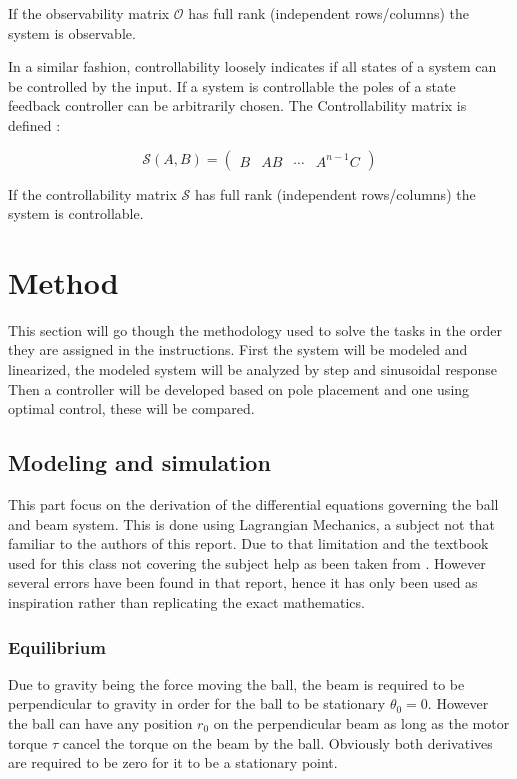 \documentclass[a4paper, titlepage]{article}
\begin{document}
If the observability matrix $\mathcal{O}$ has full rank (independent rows/columns) the system is observable.

In a similar fashion, controllability loosely indicates if all states of a system can be controlled by the input. If a system is controllable the poles of a state feedback controller can be arbitrarily chosen.
The Controllability matrix is defined \citep[p.~45]{glad00}:

\begin{equation}
\mathcal{S}(A,B) = 
\begin{pmatrix}
B & AB & \cdots & A^{n-1}C
\end{pmatrix}
\label{equ:ctrb}
\end{equation}

If the controllability matrix $\mathcal{S}$ has full rank (independent rows/columns) the system is controllable.

\section{Method}
This section will go though the methodology used to solve the tasks in the order they are assigned in the instructions.
First the system will be modeled and linearized, the modeled system will be analyzed by step and sinusoidal response
Then a controller will be developed based on pole placement and one using optimal control, these will be compared.

\subsection{Modeling and simulation}
This part focus on the derivation of the differential equations governing the ball and beam system.
This is done using Lagrangian Mechanics, a subject not that familiar to the authors of this report.
Due to that limitation and the textbook used for this class not covering the subject help as been taken from \citep{BolvarVincenty2014ModellingTB}.
However several errors have been found in that report, hence it has only been used as inspiration rather than replicating the exact mathematics.

\subsubsection{Equilibrium}
Due to gravity being the force moving the ball, the beam is required to be perpendicular to gravity in order for the ball to be stationary $\theta_0 = 0$.
However the ball can have any position $r_0$ on the perpendicular beam as long as the motor torque $\tau$ cancel the torque on the beam by the ball.
Obviously both derivatives are required to be zero for it to be a stationary point.
\end{document}
